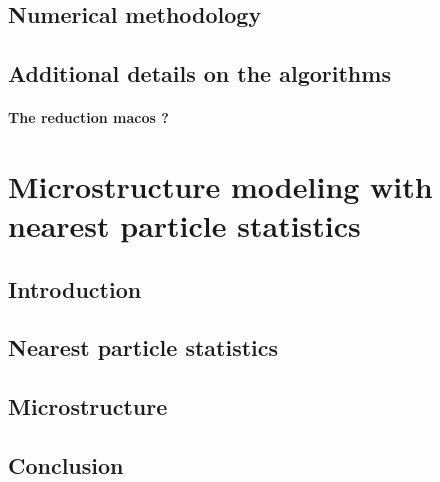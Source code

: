 \documentclass[12pt,a4paper,openany]{My_book}
\begin{document}
\section{Numerical methodology}
\label{sec:methodo}






\section{Additional details on the algorithms}


\subsubsection{The reduction macos ? }


\chapter{Microstructure modeling with nearest particle statistics}
\localtableofcontents

\section{Introduction}


\section{Nearest particle statistics}
\label{sec:nearest}


\section{Microstructure}
\label{sec:microstructure}



\section{Conclusion}
\label{sec:conclusion}

\end{document}
